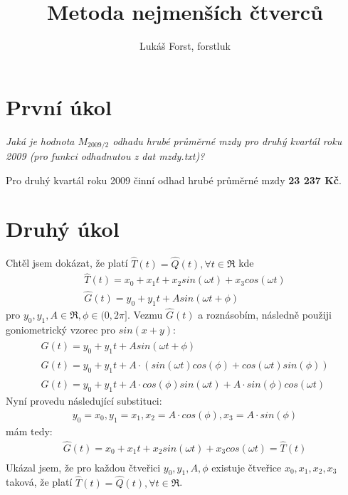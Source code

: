 \documentclass[12pt]{article}
\begin{document}
\title{Metoda nejmenších čtverců}
\author{Lukáš Forst, forstluk}
\date{}
\maketitle

\section{První úkol}
\textit{Jaká je hodnota $M_{2009/2}$ odhadu hrubé průměrné mzdy pro druhý kvartál roku 2009 (pro funkci odhadnutou z dat mzdy.txt)?}\newline

Pro druhý kvartál roku 2009 činní odhad hrubé průměrné mzdy \textbf{23 237 Kč}.
\section{Druhý úkol}

Chtěl jsem dokázat, že platí $\hat{T}(t) = \hat{Q}(t), \forall t\in\Re$ kde 
\begin{gather*}
\hat{T}(t) = x_{0} + x_{1}t + x_{2}sin(\omega t) + x_{3}cos(\omega t)\\
\hat{G}(t) = y_{0} + y_{1}t + Asin(\omega t + \phi)
\end{gather*}
pro $y_{0}, y_{1}, A \in \Re, \phi \in (0, 2\pi]$.\newline
Vezmu $\hat{G}(t)$ a roznásobím, následně použiji goniometrický vzorec pro $sin(x + y)$:
\begin{gather*}
\hat{G}(t) = y_{0} + y_{1}t + Asin(\omega t + \phi)\\
\hat{G}(t) = y_{0} + y_{1}t + A\cdot (sin(\omega t)cos(\phi) + cos(\omega t)sin(\phi))\\
\hat{G}(t) = y_{0} + y_{1}t + A\cdot cos(\phi)sin(\omega t) + A\cdot sin(\phi)cos(\omega t)
\end{gather*}
Nyní provedu následující substituci:
\begin{gather*}
y_{0} = x_{0}, y_{1} = x_{1}, x_{2} = A\cdot cos(\phi), x_{3} = A\cdot sin(\phi)
\end{gather*}
mám tedy:
\begin{gather*}
\hat{G}(t) = x_{0} + x_{1}t + x_{2}sin(\omega t) + x_{3}cos(\omega t) = \hat{T}(t)\\
\end{gather*}
Ukázal jsem, že pro každou čtveřici $y_{0}, y_{1}, A, \phi$ existuje čtveřice $x_{0}, x_{1}, x_{2}, x_{3}$ taková, že platí $\hat{T}(t) = \hat{Q}(t), \forall t\in\Re$.
\end{document}
